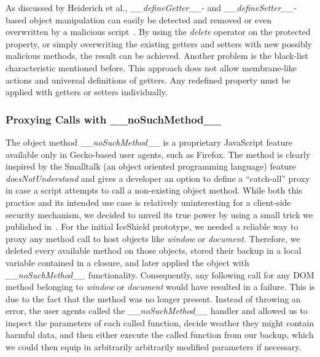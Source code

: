       As discussed by Heiderich et al., \textit{\_\_defineGetter\_\_}- and \textit{\_\_defineSetter\_\_}-based object manipulation can easily be detected and removed or even overwritten by a malicious script~\cite{heiderich2011iceshield}. By using the \textit{delete} operator on the protected property, or simply overwriting the existing getters and setters with new possibly malicious methods, the result can be achieved. Another problem is the black-list characteristic mentioned before. This approach does not allow membrane-like actions and universal definitions of getters. Any redefined property must be applied with getters or setters individually.

      \subsubsection{Proxying Calls with \_\_noSuchMethod\_\_}
      \label{subsubsubsec:6.3.1.2.proxying_calls_with_nosuchmethod}

      The object method \textit{\_\_noSuchMethod\_\_} is a proprietary JavaScript feature available only in Gecko-based user agents, such as Firefox. The method is clearly inspired by the Smalltalk (an object oriented programming language) feature \textit{doesNotUnderstand} and gives a developer an option to define a ``catch-all'' proxy in case a script attempts to call a non-existing object method. While both this practice and its intended use case is relatively uninteresting for a client-side security mechanism, we decided to unveil its true power by using a small trick we published in~\cite{heiderich2011iceshield}. For the initial IceShield prototype, we needed a reliable way to proxy any method call to host objects like \textit{window} or \textit{document}. Therefore, we deleted every available method on those objects, stored their backup in a local variable contained in a closure, and later applied the object with \textit{\_\_noSuchMethod\_\_} functionality. Consequently, any following call for any DOM method belonging to \textit{window} or \textit{document} would have resulted in a failure. This is due to the fact that the method was no longer present. Instead of throwing an error, the user agents called the \textit{\_\_noSuchMethod\_\_} handler and allowed us to inspect the parameters of each called function, decide weather they might contain harmful data, and then either execute the called function from our backup, which we could then equip in arbitrarily  arbitrarily modified parameters if necessary. \\

